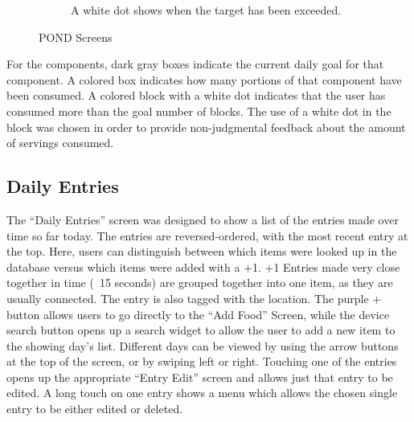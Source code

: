 \begin{figure}
\begin{subfigure}[t]{1.25in}
	\end{subfigure}
\quad
\begin{subfigure}[t]{1.25in}
		\centering
		\setlength\fboxsep{0pt}
\setlength\fboxrule{0.5pt}
		\caption{A white dot shows when the target has been exceeded. }\label{fig:pond_overview_d}
	\end{subfigure}

	\caption{POND Screens}\label{fig:POND_overview}
\end{figure}


For the components, dark gray boxes indicate the current daily goal for that component. A colored box indicates how many portions of that component have been consumed. A colored block with a white dot indicates that the user has consumed more than the goal number of blocks. The use of a white dot in the block was chosen in order to provide non-judgmental feedback about the amount of servings consumed. 

\subsection{Daily Entries}
The ``Daily Entries'' screen was designed to show a list of the entries made over time so far today. The entries are reversed-ordered, with the most recent entry at the top. Here, users can distinguish between which items were looked up in the database versus which items were added with a +1. +1 Entries made very close together in time (~15 seconds) are grouped together into one item, as they are usually connected. The entry is also tagged with the location. 
The purple + button allows users to go directly to the ``Add Food'' Screen, while the device search button opens up a search widget to allow the user to add a new item to the showing day's list. Different days can be viewed by using the arrow buttons at the top of the screen, or by swiping left or right. Touching one of the entries opens up the appropriate ``Entry Edit'' screen and allows just that entry to be edited. A long touch on one entry shows a menu which allows the chosen single entry to be either edited or deleted. 

